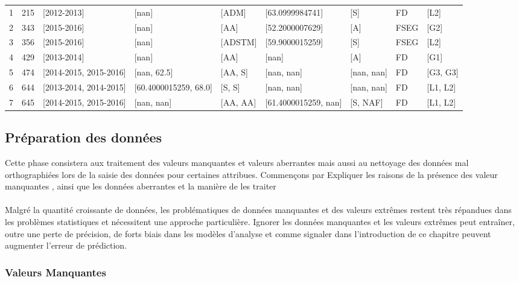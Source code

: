 \begin{table}
\begin{tabular}{lrlllllll}
	1 &  215 &             [2012-2013] &                  [nan] &     [ADM] &       [63.0999984741] &         [S] &    FD &      [L2] \\
	2 &  343 &             [2015-2016] &                  [nan] &      [AA] &       [52.2000007629] &         [A] &  FSEG &      [G2] \\
	3 &  356 &             [2015-2016] &                  [nan] &   [ADSTM] &       [59.9000015259] &         [S] &  FSEG &      [L2] \\
	4 &  429 &             [2013-2014] &                  [nan] &      [AA] &                 [nan] &         [A] &    FD &      [G1] \\
	5 &  474 &  [2014-2015, 2015-2016] &            [nan, 62.5] &   [AA, S] &            [nan, nan] &  [nan, nan] &    FD &  [G3, G3] \\
	6 &  644 &  [2013-2014, 2014-2015] &  [60.4000015259, 68.0] &    [S, S] &            [nan, nan] &  [nan, nan] &    FD &  [L1, L2] \\
	7 &  645 &  [2014-2015, 2015-2016] &             [nan, nan] &  [AA, AA] &  [61.4000015259, nan] &    [S, NAF] &    FD &  [L1, L2] \\
	\bottomrule
\end{tabular}
\endgroup
\end{table}
 \subsection{Préparation des données }
Cette phase consistera aux traitement des valeurs manquantes et valeurs aberrantes mais aussi au nettoyage des données mal orthographiées lors de la saisie des données pour certaines attribues. 
Commençons par  Expliquer les raisons de la présence des valeur manquantes , ainsi que les données aberrantes et la manière de les traiter
\paragraph{}
Malgré la quantité croissante de données, les problématiques de données
manquantes et des valeurs extrêmes restent très répandues dans les
problèmes statistiques et nécessitent une approche particulière. Ignorer
les données manquantes et les valeurs extrêmes peut entraîner, outre une
perte de précision, de forts biais dans les modèles d'analyse et comme
signaler dans l'introduction de ce chapitre peuvent augmenter l'erreur
de prédiction.
\subsubsection{Valeurs Manquantes}
